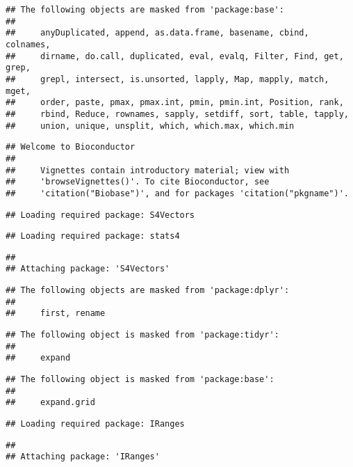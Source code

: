 \documentclass[]{article}
\begin{document}
\begin{verbatim}
## The following objects are masked from 'package:base':
## 
##     anyDuplicated, append, as.data.frame, basename, cbind, colnames,
##     dirname, do.call, duplicated, eval, evalq, Filter, Find, get, grep,
##     grepl, intersect, is.unsorted, lapply, Map, mapply, match, mget,
##     order, paste, pmax, pmax.int, pmin, pmin.int, Position, rank,
##     rbind, Reduce, rownames, sapply, setdiff, sort, table, tapply,
##     union, unique, unsplit, which, which.max, which.min
\end{verbatim}

\begin{verbatim}
## Welcome to Bioconductor
## 
##     Vignettes contain introductory material; view with
##     'browseVignettes()'. To cite Bioconductor, see
##     'citation("Biobase")', and for packages 'citation("pkgname")'.
\end{verbatim}

\begin{verbatim}
## Loading required package: S4Vectors
\end{verbatim}

\begin{verbatim}
## Loading required package: stats4
\end{verbatim}

\begin{verbatim}
## 
## Attaching package: 'S4Vectors'
\end{verbatim}

\begin{verbatim}
## The following objects are masked from 'package:dplyr':
## 
##     first, rename
\end{verbatim}

\begin{verbatim}
## The following object is masked from 'package:tidyr':
## 
##     expand
\end{verbatim}

\begin{verbatim}
## The following object is masked from 'package:base':
## 
##     expand.grid
\end{verbatim}

\begin{verbatim}
## Loading required package: IRanges
\end{verbatim}

\begin{verbatim}
## 
## Attaching package: 'IRanges'
\end{verbatim}
\end{document}
